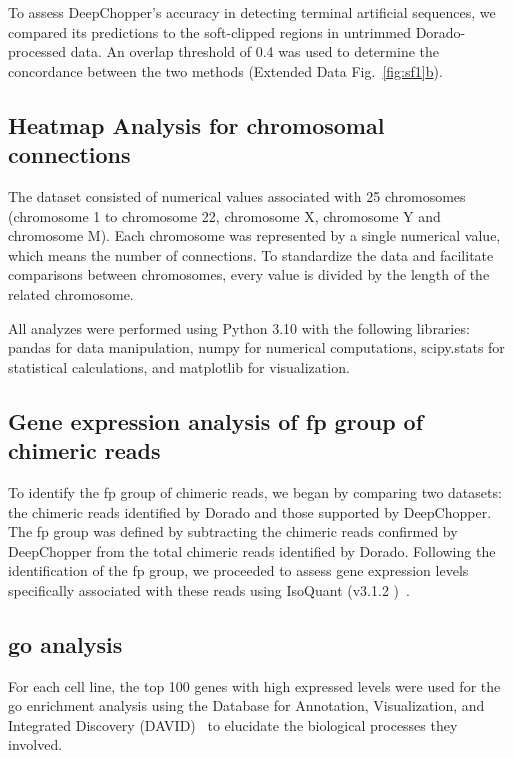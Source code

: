 \documentclass[pdflatex,sn-nature, lineno]{sn-jnl}%
\newcommand{\edfigref}[2]{Extended Data Fig.~\hyperref[#1]{\ref*{#1}#2}}
\theoremstyle{thmstyleone}%
\theoremstyle{thmstyletwo}%
\theoremstyle{thmstylethree}%
\begin{document}
To assess DeepChopper's accuracy in detecting terminal artificial sequences, we compared its predictions to the soft-clipped regions in untrimmed Dorado-processed data.
An overlap threshold of 0.4 was used to determine the concordance between the two methods (\edfigref{fig:sf1}{b}).

\subsection{Heatmap Analysis for chromosomal connections}

The dataset consisted of numerical values associated with 25 chromosomes (chromosome 1 to chromosome 22, chromosome X, chromosome Y and chromosome M).
Each chromosome was represented by a single numerical value, which means the number of connections.
To standardize the data and facilitate comparisons between chromosomes, every value is divided by the length of the related chromosome.

All analyzes were performed using Python 3.10 with the following libraries: pandas for data manipulation, numpy for numerical computations, scipy.stats for statistical calculations, and matplotlib for visualization.

\subsection{Gene expression analysis of \gls{fp} group of chimeric reads}

To identify the \gls{fp} group of chimeric reads, we began by comparing two datasets: the chimeric reads identified by Dorado and those supported by DeepChopper.
The \gls{fp} group was defined by subtracting the chimeric reads confirmed by DeepChopper from the total chimeric reads identified by Dorado.
Following the identification of the \gls{fp} group, we proceeded to assess gene expression levels specifically associated with these reads using IsoQuant (v3.1.2 )~\cite{prjibelski2023accurate}.


\subsection{\gls{go} analysis}

For each cell line, the top 100 genes with high expressed levels were used for the \gls{go} enrichment analysis using the Database for Annotation, Visualization, and Integrated Discovery (DAVID)~\cite{sherman2022david} to elucidate the biological processes they involved.
\end{document}
